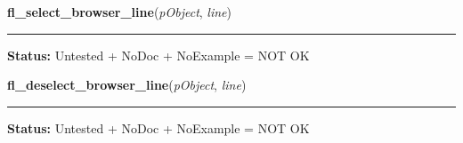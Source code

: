     \vspace{0.5ex}

\hspace{.8\funcindent}\begin{boxedminipage}{\funcwidth}

    \raggedright \textbf{fl\_select\_browser\_line}(\textit{pObject}, \textit{line})

    \vspace{-1.5ex}

    \rule{\textwidth}{0.5\fboxrule}
\setlength{\parskip}{2ex}
\setlength{\parskip}{1ex}
\textbf{Status:} Untested + NoDoc + NoExample = NOT OK



    \end{boxedminipage}

    \label{xformslib:library:fl_deselect_browser_line}

    \vspace{0.5ex}

\hspace{.8\funcindent}\begin{boxedminipage}{\funcwidth}

    \raggedright \textbf{fl\_deselect\_browser\_line}(\textit{pObject}, \textit{line})

    \vspace{-1.5ex}

    \rule{\textwidth}{0.5\fboxrule}
\setlength{\parskip}{2ex}
\setlength{\parskip}{1ex}
\textbf{Status:} Untested + NoDoc + NoExample = NOT OK



    \end{boxedminipage}

    \label{xformslib:library:fl_deselect_browser}

    \vspace{0.5ex}

